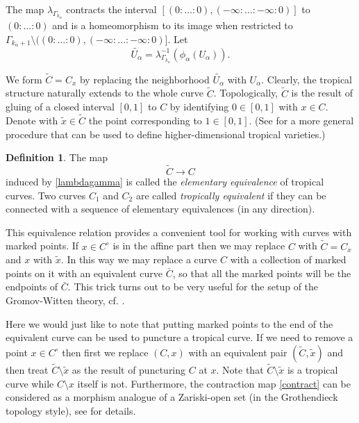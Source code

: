 \documentclass[12pt]{amsart}
\theoremstyle{plain}
\theoremstyle{definition}
\newtheorem{definition}[theorem]{Definition}
\theoremstyle{remark}
\newcommand{\<}{\langle}   %
\renewcommand{\>}{\rangle} %
\begin{document}
The map $\lambda_{\Gamma_{k_\alpha}}$
contracts the interval $[(0:\dots:0),(-\infty:\dots:-\infty:0)]$
to $(0:\dots:0)$ and is a homeomorphism to its image when restricted
to $\Gamma_{k_\alpha+1}\setminus ((0:\dots:0),(-\infty:\dots:-\infty:0)]$.
Let $$\tilde{U_\alpha}=\lambda_{\Gamma_{k_\alpha}}^{-1}(\phi_\alpha(U_\alpha)).$$


We form $\tilde{C}=C_x$ by replacing the neighborhood $\tilde{U_\alpha}$ with
$U_\alpha$. Clearly, the tropical structure naturally extends
to the whole curve $\tilde{C}$. Topologically, $\tilde{C}$ is
the result of gluing of a closed interval $[0,1]$
to $C$ by identifying $0\in [0,1]$ with $x\in C$. Denote with
$\tilde{x}\in\tilde{C}$ the point corresponding to $1\in [0,1]$.
(See \cite{Mi-ICM} for a more general procedure that can be used
to define higher-dimensional tropical varieties.)

\begin{definition}
The map
\begin{equation}\label{contract}
\tilde{C}\to C
\end{equation}
induced by \eqref{lambdagamma}
is called the {\em elementary
equivalence} of tropical curves. Two curves $C_1$ and $C_2$
are called {\em tropically equivalent} if they can be connected
with a sequence of elementary equivalences (in any direction).
\end{definition}

This equivalence relation provides a convenient tool
for working with curves with marked points.
If $x\in C^\circ$ is in the affine part then
we may replace $C$ with $\tilde{C}=C_x$ and $x$ with
$\tilde{x}$. In this way we may replace a curve $C$ with
a collection of marked points on it with an equivalent curve $\bar{C}$,
so that all the marked points will be the endpoints of $\bar{C}$.
This trick turns out to be very useful for the setup of the Gromov-Witten
theory, cf. \cite{Mibook}.

Here we would just like to note that putting marked points
to the end of the equivalent curve can be used to puncture
a tropical curve. If we need to remove a point $x\in C^\circ$
then first we replace $(C,x)$ with an equivalent pair $(\tilde{C},\tilde{x})$
and then treat $\tilde{C}\setminus\tilde{x}$ as the result of puncturing
$C$ at $x$. Note that $\tilde{C}\setminus\tilde{x}$ is a tropical curve
while $C\setminus x$ itself is not.
Furthermore, the contraction map \eqref{contract} can be considered
as a morphism analogue of a Zariski-open set (in the Grothendieck topology style), see
\cite{Mibook} for details.
\end{document}
